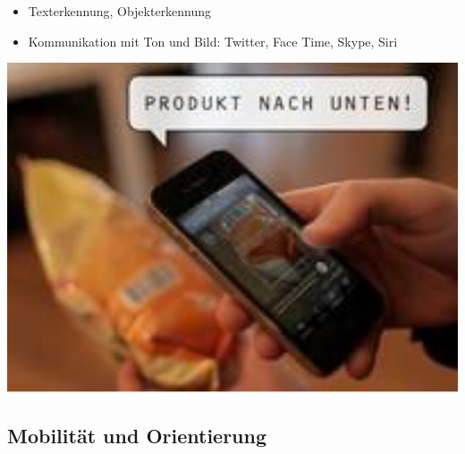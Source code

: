 \documentclass[paper=a4, fontsize=11pt]{scrartcl} %
\numberwithin{equation}{section} %
\numberwithin{figure}{section} %
\numberwithin{table}{section} %
\begin{document}
\begin{minipage}[c]{0.55\textwidth}
\begin{itemize}
\item Texterkennung, Objekterkennung
\item Kommunikation mit Ton und Bild: Twitter, Face Time, Skype, Siri
\end{itemize}
\end{minipage}
\begin{minipage}[c]{0.35\textwidth}
\includegraphics[width=\textwidth]{imgs/iphone}
\end{minipage}

\subsection{Mobilität und Orientierung}
\end{document}
